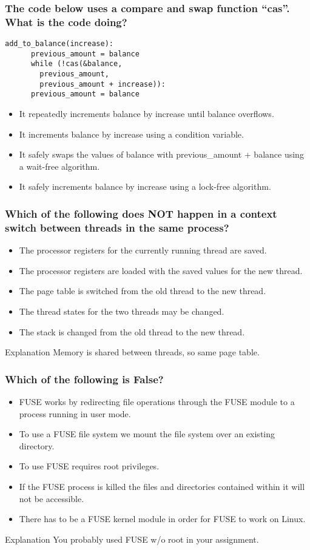 \documentclass{beamer}
\begin{document}
\begin{frame}[fragile]
  \frametitle{The code below uses a compare and swap function “cas”. What is the code doing?}
  \begin{lstlisting}[style=customc]
    add_to_balance(increase):
      previous_amount = balance
      while (!cas(&balance,
        previous_amount,
        previous_amount + increase)):
      previous_amount = balance
  \end{lstlisting}
  \begin{itemize}
    \item It repeatedly increments balance by increase until balance overflows.
    \item It increments balance by increase using a condition variable.
    \item It safely swaps the values of balance with previous\_amount + balance using a wait-free algorithm.
    \item<alert@2> It safely increments balance by increase using a lock-free algorithm.
  \end{itemize}
\end{frame}
\begin{frame}
  \frametitle{Which of the following does NOT happen in a context switch between threads in the same process?}
  \begin{itemize}
    \item The processor registers for the currently running thread are saved.
    \item The processor registers are loaded with the saved values for the new thread.
    \item<alert@2> The page table is switched from the old thread to the new thread.
    \item The thread states for the two threads may be changed.
    \item The stack is changed from the old thread to the new thread.  
  \end{itemize}
  \pause
  \begin{block}{Explanation}
    Memory is shared between threads, so same page table.
  \end{block}
\end{frame}
\begin{frame}
  \frametitle{Which of the following is False?}
  \begin{itemize}
    \item FUSE works by redirecting file operations through the FUSE module to a process running in user mode.
    \item To use a FUSE file system we mount the file system over an existing directory.
    \item<alert@2> To use FUSE requires root privileges.
    \item If the FUSE process is killed the files and directories contained within it will not be accessible.
    \item There has to be a FUSE kernel module in order for FUSE to work on Linux.
  \end{itemize}
  \pause
  \begin{block}{Explanation}
    You probably used FUSE w/o root in your assignment.
  \end{block}
\end{frame}
\end{document}
